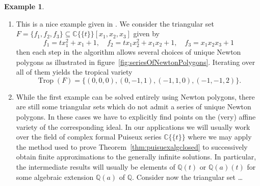 \documentclass[
  paper=a4,
  titlepage,
  bibliography=totoc,
  listof=totoc,
  pagesize=pdftex
]{scrartcl}
\numberwithin{figure}{section}
\numberwithin{equation}{section}
\numberwithin{table}{section}
\newcommand*\setC{\mathds{C}}
\newcommand*\setQ{\mathds{Q}}
\newcommand*\puiseux[2]{#1\{\!\{#2\}\!\}}
\newcommand*\CCt{\puiseux{\setC}{t}}
\DeclareMathOperator{\Trop}{Trop}
\theoremstyle{definition}
\newtheorem{example}[definition]{Example}
\numberwithin{definition}{section}
\begin{document}
\begin{example} \label{ex:zeroDimTrop}\
  \begin{enumerate}
    \item This is a nice example given in \cite[Example~2.13]{tropPointsLinks}. We
      consider the triangular set $F = \{ f_1, f_2, f_3 \} \subseteq \CCt[x_1, x_2, x_3]$
      given by
      \[
        f_1 = tx_1^2 + x_1 + 1, \quad
        f_2 = tx_1x_2^2 + x_1x_2 + 1, \quad
        f_3 = x_1x_2x_3+1
      \]
      then each step in the algorithm allows several choices of unique Newton polygons as
      illustrated in figure~\ref{fig:seriesOfNewtonPolygons}. Iterating over all of them
      yields the tropical variety
      \[
        \Trop(F) = \{ (0,0,0), (0,-1,1), (-1,1,0),(-1,-1,2) \}.
      \]
    \item While the first example can be solved entirely using Newton polygons, there are
      still some triangular sets which do not admit a series of unique Newton polygons. In
      these cases we have to explicitly find points on the (very) affine variety of the
      corresponding ideal. In our applications we will usually work over the field of
      complex formal Puiseux series $\CCt$ where we may apply the method used to prove
      Theorem~\ref{thm:puisuexalgclosed} to successively obtain finite approximations to
      the generally infinite solutions. In particular, the intermediate results will
      usually be elements of $\setQ(t)$ or $\setQ(a)(t)$ for some algebraic extension
      $\setQ(a)$ of $\setQ$. Consider now the triangular set \dots%
      \label{ex:zdt2}
  \end{enumerate}
\end{example}
\end{document}
